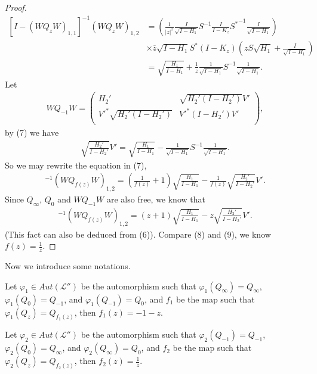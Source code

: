 \documentclass{amsart}
\newcommand{\LLL}{\mathcal L} %
\begin{document}
\begin{proof}
\begin{equation}
\begin{split}
[I - (WQ_{z}W)_{1,1}]^{-1}(WQ_{z}W)_{1,2} &= (\frac{1}{|z|^{2}}\frac{I}{\sqrt{I-H_1}}S^{-1}\frac{I}{I-K_z}{S^{*}}^{-1}\frac{I}{\sqrt{I-H_1}})\\
                                          & \times \overline{z}\sqrt{I-H_1}S^{*}(I-K_z)(zS\sqrt{H_1} + \frac{I}{\sqrt{I-H_1}}) \\
                                          &= \sqrt{\frac{H_1}{I-H_1}} + \frac{1}{z}\frac{1}{\sqrt{I-H_1}}S^{-1}\frac{1}{\sqrt{I-H_1}}.
\end{split}
\end{equation}
Let
\begin{align*}
WQ_{-1}W = \left(
             \begin{array}{cc}
               H_{2}' & \sqrt{H_{2}'(I - H_{2}')}V' \\
               {V'}^{*}\sqrt{H_{2}'(I - H_{2}')} & {V'}^{*}(I - H_{2}') V'  \\
             \end{array}
           \right),
\end{align*}
by (7) we have
\begin{align*}
\sqrt{\frac{H_{2}'}{I - H_{2}'}}V' = \sqrt{\frac{H_1}{I-H_1}} - \frac{1}{\sqrt{I-H_1}}S^{-1}\frac{1}{\sqrt{I-H_1}}.
\end{align*}
So we may rewrite the equation in (7),
\begin{align}
[I - (WQ_{f(z)}W)_{1,1}]^{-1}(WQ_{f(z)}W)_{1,2} = (\frac{1}{f(z)} + 1)\sqrt{\frac{H_1}{I-H_1}} - \frac{1}{f(z)}\sqrt{\frac{H_{2}'}{I - H_{2}'}}V'.
\end{align}
Since $Q_{\infty}$, $Q_{0}$ and $WQ_{-1}W$ are also free, we know that
\begin{align}
[I - (WQ_{f(z)}W)_{1,1}]^{-1}(WQ_{f(z)}W)_{1,2} = (z + 1)\sqrt{\frac{H_1}{I-H_1}} - z \sqrt{\frac{H_{2}'}{I - H_{2}'}}V'.
\end{align}
(This fact can also be deduced from (6)). Compare (8) and (9), we know $f(z) = \frac{1}{z}$.
\end{proof}

Now we introduce some notations.

Let $\varphi_{1} \in Aut(\LLL'')$ be the automorphism such that $\varphi_{1}(Q_{\infty}) = Q_{\infty}$, $\varphi_{1}(Q_{0}) = Q_{-1}$,
and $\varphi_{1}(Q_{-1}) = Q_{0}$, and $f_1$ be the map such that $\varphi_{1}(Q_{z}) = Q_{f_{1}(z)}$, then $f_{1}(z) = -1 -z$.

Let $\varphi_{2} \in Aut(\LLL'')$ be the automorphism such that $\varphi_{2}(Q_{-1}) = Q_{-1}$, $\varphi_{2}(Q_{0}) = Q_{\infty}$,
and $\varphi_{2}(Q_{\infty}) = Q_{0}$, and $f_2$ be the map such that $\varphi_{2}(Q_{z}) = Q_{f_{2}(z)}$, then $f_{2}(z) = \frac{1}{z}$.
\end{document}
